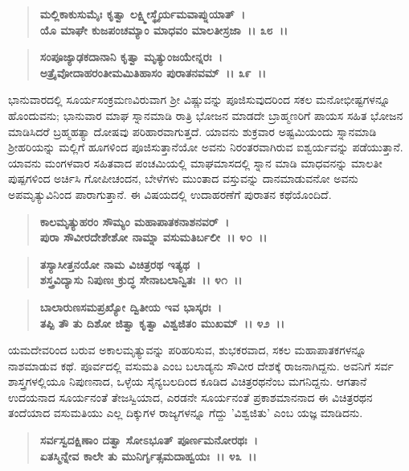 \begin{verse}
\textbf{ಮಲ್ಲಿಕಾಕುಸುಮೈಃ ಕೃತ್ವಾ ಲಕ್ಷ್ಮೀಸ್ಥೈರ್ಯಮವಾಪ್ನುಯಾತ್~।}\\\textbf{ಯೊ ಮಾಘೇ ಕುಜಪಂಚಮ್ಯಾಂ ಮಾಧವಂ ಮಾಲತೀಸ್ರಜಾ~।। ೩೮~।।} 
\end{verse}

\begin{verse}
\textbf{ಸಂಪೂಜ್ಯಾಢಕದಾನಾನಿ ಕೃತ್ವಾ ಮೃತ್ಯುಂಜಯೇನ್ನರಃ~।}\\\textbf{ಅತ್ರೈವೋದಾಹರಂತೀಮಮಿತಿಹಾಸಂ ಪುರಾತನವಮ್~।। ೩೯~।।}
\end{verse}

ಭಾನುವಾರದಲ್ಲಿ ಸೂರ್ಯಸಂಕ್ರಮಣವಿರುವಾಗ ಶ‍್ರೀ ವಿಷ್ಣುವನ್ನು ಪೂಜಿಸುವುದರಿಂದ ಸಕಲ ಮನೋಭೀಷ್ಟಗಳನ್ನೂ ಹೊಂದುವನು; ಭಾನುವಾರ ಮಾಘ ಸ್ನಾನಮಾಡಿ ರಾತ್ರಿ ಭೋಜನ ಮಾಡದೇ ಬ್ರಾಹ್ಮಣರಿಗೆ ಪಾಯಸ ಸಹಿತ ಭೋಜನ ಮಾಡಿಸಿದರೆ ಬ್ರಹ್ಮಹತ್ಯಾ ದೋಷವು ಪರಿಹಾರವಾಗುತ್ತದೆ. ಯಾವನು ಶುಕ್ರವಾರ ಅಷ್ಟಮಿಯಂದು ಸ್ನಾನಮಾಡಿ ಶ‍್ರೀಹರಿಯನ್ನು ಮಲ್ಲಿಗೆ ಹೂಗಳಿಂದ ಪೂಜಿಸುತ್ತಾನೆಯೋ ಅವನು ನಿರಂತರವಾಗಿರುವ ಐಶ್ವರ್ಯವನ್ನು ಪಡೆಯುತ್ತಾನೆ. ಯಾವನು ಮಂಗಳವಾರ ಸಹಿತವಾದ ಪಂಚಮಿಯಲ್ಲಿ ಮಾಘಮಾಸದಲ್ಲಿ ಸ್ನಾನ ಮಾಡಿ ಮಾಧವನನ್ನು ಮಾಲತೀ ಪುಷ್ಪಗಳಿಂದ ಅರ್ಚಿಸಿ ಗೋಪೀಚಂದನ, ಬೇಳೆಗಳು ಮುಂತಾದ ವಸ್ತುವನ್ನು ದಾನಮಾಡುವನೋ ಅವನು ಅಪಮೃತ್ಯುವಿನಿಂದ ಪಾರಾಗುತ್ತಾನೆ. ಈ ವಿಷಯದಲ್ಲಿ ಉದಾಹರಣೆಗೆ ಪುರಾತನ ಕಥೆಯೊಂದಿದೆ.

\begin{verse}
\textbf{ಕಾಲಮೃತ್ಯುಹರಂ ಸೌಮ್ಯಂ ಮಹಾಪಾತಕನಾಶನವರ್~।}\\\textbf{ಪುರಾ ಸೌವೀರದೇಶೇಶೋ ನಾಮ್ನಾ ವಸುಮತಿರ್ಬಲೀ~।। ೪೦~।। }
\end{verse}

\begin{verse}
\textbf{ತಸ್ಯಾಸೀತ್ತನಯೋ ನಾಮ ವಿಚಿತ್ರರಥ ಇತ್ಯಥ~।}\\\textbf{ಶಸ್ತ್ರವಿದ್ಯಾಸು ನಿಪುಣಃ ಕ್ರುದ್ಧ ಸೇನಾಬಲಾನ್ವಿತಃ~।। ೪೧~।।}
\end{verse}

\begin{verse}
\textbf{ಬಾಲಾರುಣಸಮಪ್ರಖ್ಯೋ ದ್ವಿತೀಯ ಇವ ಭಾಸ್ಕರಃ~।}\\\textbf{ತಪ್ಪಿ ತೌ ತು ದಿಶೋ ಜಿತ್ವಾ ಕೃತ್ವಾ ವಿಶ್ವಜಿತಂ ಮುಖಮ್~।। ೪೨~।।}
\end{verse}

ಯಮದೇವರಿಂದ ಬರುವ ಅಕಾಲಮೃತ್ಯುವನ್ನು ಪರಿಹರಿಸುವ, ಶುಭಕರವಾದ, ಸಕಲ ಮಹಾಪಾತಕಗಳನ್ನೂ ನಾಶಮಾಡುವ ಕಥೆ. ಪೂರ್ವದಲ್ಲಿ ವಸುಮತಿ ಎಂಬ ಬಲಾಡ್ಯನು ಸೌವೀರ ದೇಶಕ್ಕೆ ರಾಜನಾಗಿದ್ದನು. ಅವನಿಗೆ ಸರ್ವ ಶಾಸ್ತ್ರಗಳಲ್ಲಿಯೂ ನಿಪುಣನಾದ, ಒಳ್ಳೆಯ ಸೈನ್ಯಬಲದಿಂದ ಕೂಡಿದ ವಿಚಿತ್ರರಥನೆಂಬ ಮಗನಿದ್ದನು. ಆಗತಾನೆ ಉದಯನಾದ ಸೂರ್ಯನಂತೆ ತೇಜಸ್ವಿಯಾದ, ಎರಡನೇ ಸೂರ್ಯನಂತೆ ಪ್ರಕಾಶಮಾನನಾದ ಈ ವಿಚಿತ್ರರಥನ ತಂದೆಯಾದ ವಸುಮತಿಯು ಎಲ್ಲ ದಿಕ್ಕುಗಳ ರಾಜ್ಯಗಳನ್ನೂ ಗೆದ್ದು 'ವಿಶ್ವಜಿತು' ಎಂಬ ಯಜ್ಞ ಮಾಡಿದನು.

\begin{verse}
\textbf{ಸರ್ವಸ್ವದಕ್ಷಿಣಾಂ ದತ್ವಾ ಸೋಽಭೂತ್ ಪೂರ್ಣಮನೋರಥಃ~।}\\\textbf{ಏತಸ್ಮಿನ್ನೇವ ಕಾಲೇ ತು ಮುನಿರ್ಗೃತ್ಸಮದಾಹ್ವಯಃ~।। ೪೩~।। }
\end{verse}

